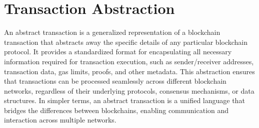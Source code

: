 

\section{Transaction Abstraction }

An abstract transaction is a generalized representation of a blockchain transaction that abstracts away the specific details of any particular blockchain protocol. It provides a standardized format for encapsulating all necessary information required for transaction execution, such as sender/receiver addresses, transaction data, gas limits, proofs, and other metadata. This abstraction ensures that transactions can be processed seamlessly across different blockchain networks, regardless of their underlying protocols, consensus mechanisms, or data structures. In simpler terms, an abstract transaction is a unified language that bridges the differences between blockchains, enabling communication and interaction across multiple networks.


